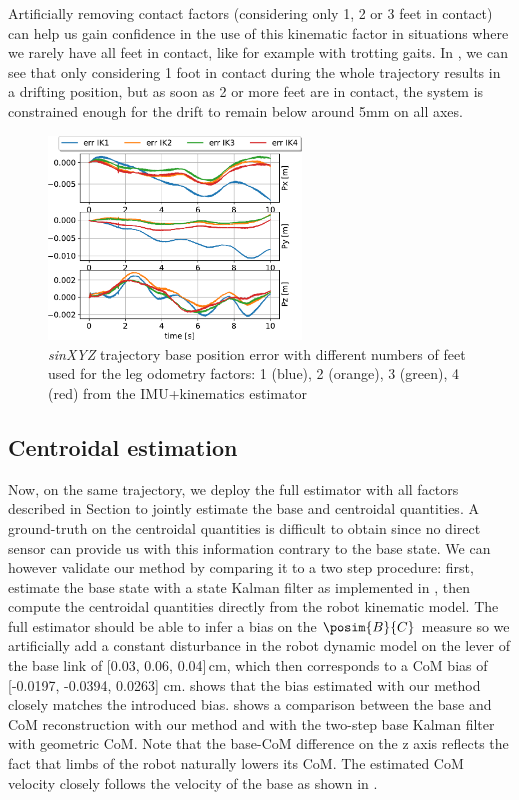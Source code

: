 Artificially removing contact factors (considering only 1, 2 or 3 feet in contact) can help us gain confidence in the use of this kinematic factor 
in situations where we rarely have all feet in contact, like for example with trotting gaits. In , we can see that only considering 
1 foot in contact during the whole trajectory results in a drifting position, but as soon as 2 or more feet are in contact, the system is constrained enough 
for the drift to remain below around 5mm on all axes. 
%
\begin{figure}[h]
    \centering
    \includegraphics[width=0.6\textwidth]{figures/centroidal/base_position_err_IKn.pdf}
    \caption{\textit{sinXYZ} trajectory base position error with different numbers of feet used for the leg odometry factors: 
    1 (blue), 2 (orange), 3 (green), 4 (red) from the IMU+kinematics estimator}
    \label{fig:ErrIKn}
\end{figure}
%

\subsection{Centroidal estimation}

Now, on the same trajectory, we deploy the full estimator with all factors described in Section  to jointly 
estimate the base and centroidal quantities. A ground-truth on the centroidal quantities is difficult to obtain since no direct 
sensor can provide us with this information contrary to the base state. 
We can however validate our method by comparing it to a two step procedure: first, estimate the base state with a state Kalman filter as 
implemented in \cite{bledt2018cheetah}, then compute the centroidal quantities directly from the robot kinematic model. 
The full estimator should be able to infer a bias on the $\posim{B}{C}$ measure so we artificially add a constant disturbance 
in the robot dynamic model on the lever of the base link of [0.03, 0.06, 0.04]\,cm, which then corresponds to a CoM bias of 
[-0.0197, -0.0394,  0.0263] cm.  shows that the bias estimated with our method closely matches the introduced bias. 
 shows a comparison between the base and CoM reconstruction with our method and with the two-step base Kalman filter 
with geometric CoM. Note that the base-CoM difference on the z axis reflects the fact that limbs of the robot naturally lowers  its CoM. 
The estimated CoM velocity closely follows the velocity of the base as shown in .


